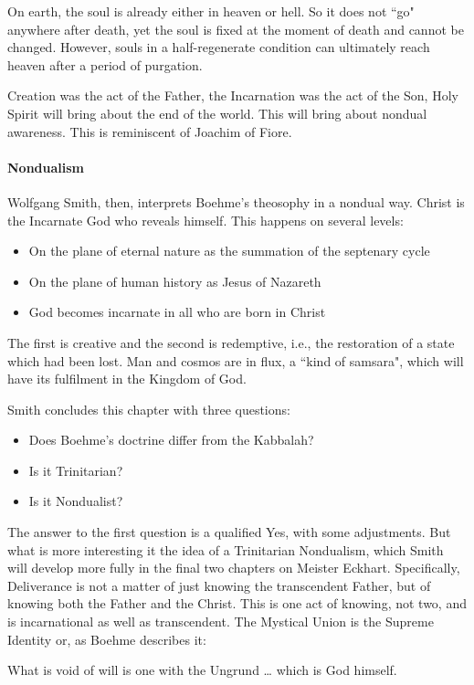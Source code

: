 On earth, the soul is already either in heaven or hell. So it does not ``go" anywhere after death, yet the soul is fixed at the moment of death and cannot be changed. However, souls in a half-regenerate condition can ultimately reach heaven after a period of purgation.

Creation was the act of the Father, the Incarnation was the act of the Son, Holy Spirit will bring about the end of the world. This will bring about nondual awareness. This is reminiscent of Joachim of Fiore.

\paragraph{Nondualism}
Wolfgang Smith, then, interprets Boehme's theosophy in a nondual way. Christ is the Incarnate God who reveals himself. This happens on several levels:

\begin{itemize}
\item On the plane of eternal nature as the summation of the septenary cycle 
\item On the plane of human history as Jesus of Nazareth 
\item God becomes incarnate in all who are born in Christ 
\end{itemize}
The first is creative and the second is redemptive, i.e., the restoration of a state which had been lost. Man and cosmos are in flux, a ``kind of samsara", which will have its fulfilment in the Kingdom of God.

Smith concludes this chapter with three questions:

\begin{itemize}
\item Does Boehme's doctrine differ from the Kabbalah? 
\item Is it Trinitarian? 
\item Is it Nondualist? 
\end{itemize}
The answer to the first question is a qualified Yes, with some adjustments. But what is more interesting it the idea of a Trinitarian Nondualism, which Smith will develop more fully in the final two chapters on Meister Eckhart. Specifically, Deliverance is not a matter of just knowing the transcendent Father, but of knowing both the Father and the Christ. This is one act of knowing, not two, and is incarnational as well as transcendent. The Mystical Union is the Supreme Identity or, as Boehme describes it:

\begin{quotex}
What is void of will is one with the Ungrund … which is God himself.

\end{quotex}
